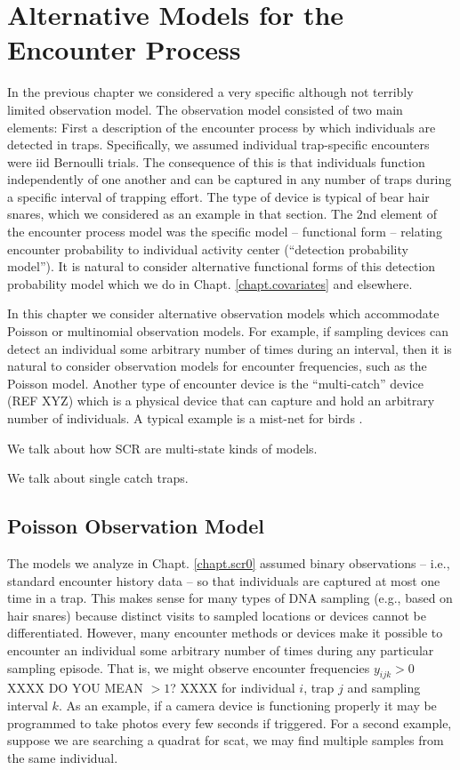 ﻿\chapter{Alternative Models for the Encounter Process}
\label{chapt.poisson-mn}

In the previous chapter we considered a very specific although not
terribly limited observation model. The observation model consisted of
two main elements: First a description of the encounter process 
by which individuals are detected in traps. Specifically, we 
assumed individual trap-specific encounters were iid Bernoulli
trials. The consequence of this is that individuals function
independently of one another and can be captured in
any number of traps during a specific interval of trapping
effort. The type of device is typical of bear hair snares, which we
considered as an example in that section. The 2nd element of the
encounter process model was the specific model – functional form –
relating encounter probability to individual activity center
(``detection probability model'').  It is natural to consider
alternative functional forms of this detection probability model which
we do in Chapt. \ref{chapt.covariates} and elsewhere. 

In this chapter we consider alternative observation models which
accommodate Poisson or multinomial observation models. For example, if
sampling devices can detect an individual some arbitrary number of
times during an interval, then it is natural to consider observation
models for encounter frequencies, such as the Poisson model. Another
type of encounter device is the ``multi-catch'' device (REF XYZ) which
is a physical device that can capture and hold an arbitrary number of
individuals. A typical example is a mist-net for birds 
\citep{borchers_efford:2008}.

We talk about how SCR are multi-state kinds of models. 

We talk about single catch traps. 


\section{Poisson Observation Model}

The models we analyze in Chapt. \ref{chapt.scr0} assumed binary
observations -- i.e., standard encounter history data -- so
that individuals are captured at most one time in a trap.  This makes
sense for many types of DNA sampling (e.g., based on hair snares)
because distinct visits to sampled locations or devices cannot be
differentiated. However, many encounter methods or devices make it
possible to encounter an individual some arbitrary number of times
during any particular sampling episode. That is, we might observe
encounter frequencies $y_{ijk}>0$ 
XXXX DO YOU MEAN $>1$? XXXX
for individual $i$, trap $j$ and
sampling interval $k$.  As an example, if a camera device is
functioning properly it may be programmed to take photos every few
seconds if triggered.  For a second example, suppose we are searching
a quadrat for scat, we may find multiple samples from the same
individual.


